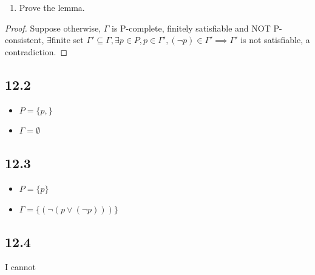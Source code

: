 \documentclass{article}
\begin{document}
\begin{enumerate}
  \item Prove the lemma.
\end{enumerate}
\begin{proof}
    Suppose otherwise, $\Gamma$ is P-complete, finitely satisfiable and NOT P-consistent,
    $\exists $finite set $\Gamma' \subseteq \Gamma, \exists p \in P, p \in \Gamma', (\neg p) \in \Gamma' \implies \Gamma' $ is not satisfiable,
    a contradiction. 
\end{proof}
\subsection*{12.2}
\begin{itemize}
    \item $P = \{p, \}$
    \item $\Gamma = \emptyset$
\end{itemize}
\subsection*{12.3}
\begin{itemize}
    \item $P = \{p\}$
    \item $\Gamma = \{(\neg (p \lor (\neg p)))\}$
\end{itemize}
\subsection*{12.4}
I cannot
\end{document}
